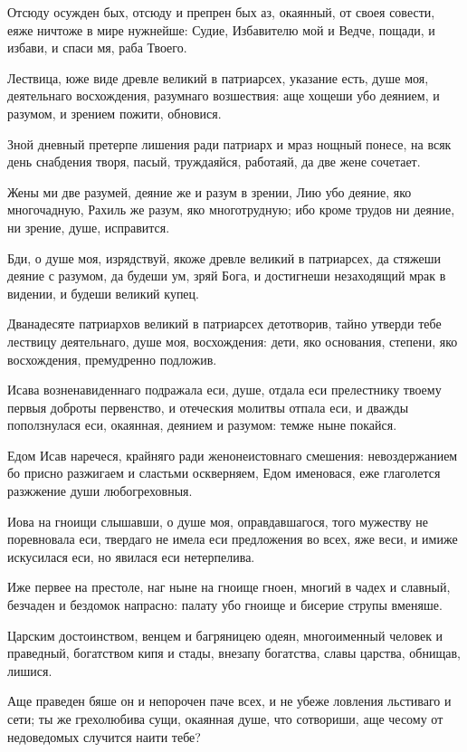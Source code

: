 Отсюду осужден бых, отсюду и препрен бых аз, окаянный, от своея совести, еяже ничтоже в мире нужнейше: Судие, Избавителю мой и Ведче, пощади, и избави, и спаси мя, раба Твоего.

Лествица, юже виде древле великий в патриарсех, указание есть, душе моя, деятельнаго восхождения, разумнаго возшествия: аще хощеши убо деянием, и разумом, и зрением пожити, обновися.

Зной дневный претерпе лишения ради патриарх и мраз нощный понесе, на всяк день снабдения творя, пасый, труждаяйся, работаяй, да две жене сочетает.

Жены ми две разумей, деяние же и разум в зрении, Лию убо деяние, яко многочадную, Рахиль же разум, яко многотрудную; ибо кроме трудов ни деяние, ни зрение, душе, исправится.

Бди, о душе моя, изрядствуй, якоже древле великий в патриарсех, да стяжеши деяние с разумом, да будеши ум, зряй Бога, и достигнеши незаходящий мрак в видении, и будеши великий купец.

Дванадесяте патриархов великий в патриарсех детотворив, тайно утверди тебе лествицу деятельнаго, душе моя, восхождения: дети, яко основания, степени, яко восхождения, премудренно подложив.

Исава возненавиденнаго подражала еси, душе, отдала еси прелестнику твоему первыя доброты первенство, и отеческия молитвы отпала еси, и дважды поползнулася еси, окаянная, деянием и разумом: темже ныне покайся.

Едом Исав наречеся, крайняго ради женонеистовнаго смешения: невоздержанием бо присно разжигаем и сластьми оскверняем, Едом именовася, еже глаголется разжжение души любогреховныя.

Иова на гноищи слышавши, о душе моя, оправдавшагося, того мужеству не поревновала еси, твердаго не имела еси предложения во всех, яже веси, и имиже искусилася еси, но явилася еси нетерпелива.

Иже первее на престоле, наг ныне на гноище гноен, многий в чадех и славный, безчаден и бездомок напрасно: палату убо гноище и бисерие струпы вменяше.

Царским достоинством, венцем и багряницею одеян, многоименный человек и праведный, богатством кипя и стады, внезапу богатства, славы царства, обнищав, лишися.

Аще праведен бяше он и непорочен паче всех, и не убеже ловления льстиваго и сети; ты же грехолюбива сущи, окаянная душе, что сотвориши, аще чесому от недоведомых случится наити тебе?

